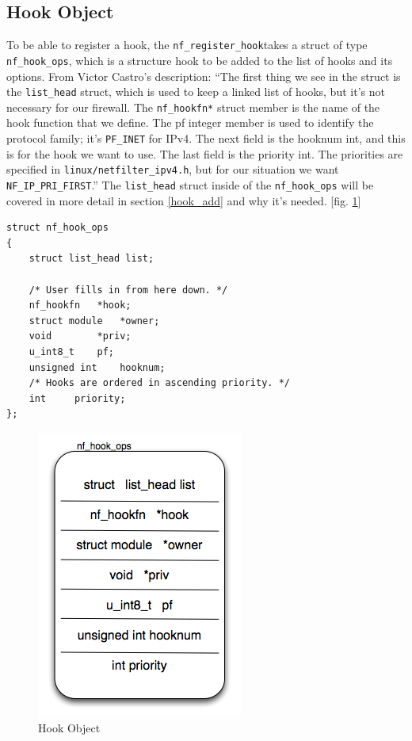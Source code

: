 \documentclass[a4paper,10pt]{article}
\newcommand{\figref}[1]{[fig. \ref{#1}]}
\begin{document}
\subsection{Hook Object}\label{hook_object}
To be able to register a hook, the \verb|nf_register_hook|takes a struct of type \verb|nf_hook_ops|, which is a structure hook to be added to the list of hooks and its options.
From Victor Castro's description: ``The first thing we see in the struct is the \verb|list_head| struct, which is used to keep a linked list of hooks, but it's not necessary for our firewall. The \verb|nf_hookfn*| struct member is the name of the hook function that we define. The pf integer member is used to identify the protocol family; it's \verb|PF_INET| for IPv4. The next field is the hooknum int, and this is for the hook we want to use. The last field is the priority int. The priorities are specified in \verb|linux/netfilter_ipv4.h|, but for our situation we want \verb|NF_IP_PRI_FIRST|.''\cite{netfilter-firewall}
The \verb|list_head| struct inside of the \verb|nf_hook_ops| will be covered in more detail in section \ref{hook_add} and why it's needed.\cite{netfilter-firewall} \figref{fig:hook_object}

\begin{lstlisting}
struct nf_hook_ops
{
	struct list_head list;

	/* User fills in from here down. */
	nf_hookfn	*hook;
	struct module	*owner;
	void		*priv;
	u_int8_t	pf;
	unsigned int	hooknum;
	/* Hooks are ordered in ascending priority. */
	int		priority;
};
\end{lstlisting}

\begin{figure}[H]
  \centering
  \includegraphics[totalheight=0.2\textheight]{images/hook_object.png}
  \caption{Hook Object}\label{fig:hook_object}
\end{figure}
\end{document}
